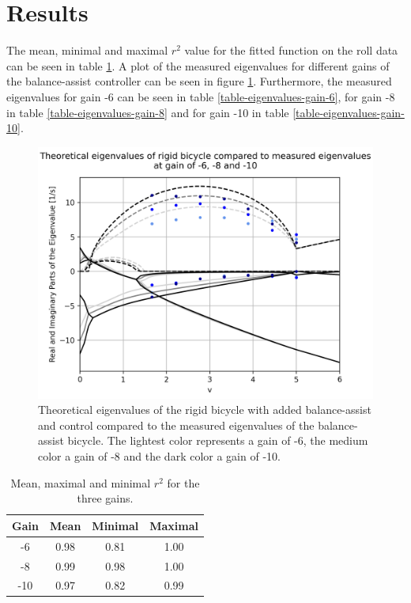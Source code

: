 \documentclass[12pt]{article}
\begin{document}
\section{Results}
The mean, minimal and maximal $r^2$ value for the fitted function on the roll data can be seen in
table \ref{table-r-squared}. A plot of the measured eigenvalues for different gains of the
balance-assist controller can be seen in figure \ref{fig-all-gains}. Furthermore, the measured
eigenvalues for gain -6 can be seen in table \ref{table-eigenvalues-gain-6}, for gain -8 in table
\ref{table-eigenvalues-gain-8} and for gain -10 in table \ref{table-eigenvalues-gain-10}.

\begin{figure}[h]
    \centering
    \includegraphics[width=\columnwidth]{figures/all-gains.png}
    \caption{Theoretical eigenvalues of the rigid bicycle with added balance-assist and control compared to the
        measured eigenvalues of the balance-assist bicycle. The lightest color represents a gain of -6, the
        medium color a gain of -8 and the dark color a gain of -10.} \label{fig-all-gains}
\end{figure}

\begin{table}[]
    \centering
    \caption{Mean, maximal and minimal $r^2$ for the three gains.} \label{table-r-squared}
    \begin{tabular}{c|c|c|c}
        \textbf{Gain} & \textbf{Mean} & \textbf{Minimal} & \textbf{Maximal} \\ \hline
        -6            & 0.98          & 0.81             & 1.00             \\
        -8            & 0.99          & 0.98             & 1.00             \\
        -10           & 0.97          & 0.82             & 0.99
    \end{tabular}
\end{table}
\end{document}
